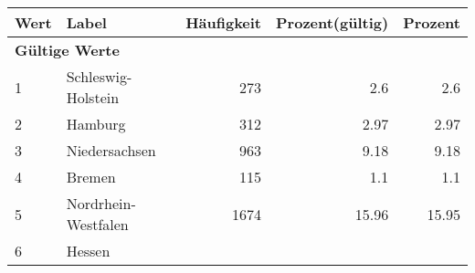      \begin{longtable}{lXrrr}
     \toprule
     \textbf{Wert} & \textbf{Label} & \textbf{Häufigkeit} & \textbf{Prozent(gültig)} & \textbf{Prozent} \\
     \endhead
     \midrule
     \multicolumn{5}{l}{\textbf{Gültige Werte}}\\

     1 &
     \multicolumn{1}{X}{ Schleswig-Holstein   } &


       \num{273} &
       \num[round-mode=places,round-precision=2]{2,6} &
         \num[round-mode=places,round-precision=2]{2,6} \\

     2 &
     \multicolumn{1}{X}{ Hamburg   } &


       \num{312} &
       \num[round-mode=places,round-precision=2]{2,97} &
         \num[round-mode=places,round-precision=2]{2,97} \\

     3 &
     \multicolumn{1}{X}{ Niedersachsen   } &


       \num{963} &
       \num[round-mode=places,round-precision=2]{9,18} &
         \num[round-mode=places,round-precision=2]{9,18} \\

     4 &
     \multicolumn{1}{X}{ Bremen   } &


       \num{115} &
       \num[round-mode=places,round-precision=2]{1,1} &
         \num[round-mode=places,round-precision=2]{1,1} \\

     5 &
     \multicolumn{1}{X}{ Nordrhein-Westfalen   } &


       \num{1674} &
       \num[round-mode=places,round-precision=2]{15,96} &
         \num[round-mode=places,round-precision=2]{15,95} \\

     6 &
     \multicolumn{1}{X}{ Hessen   } &



\end{longtable}
